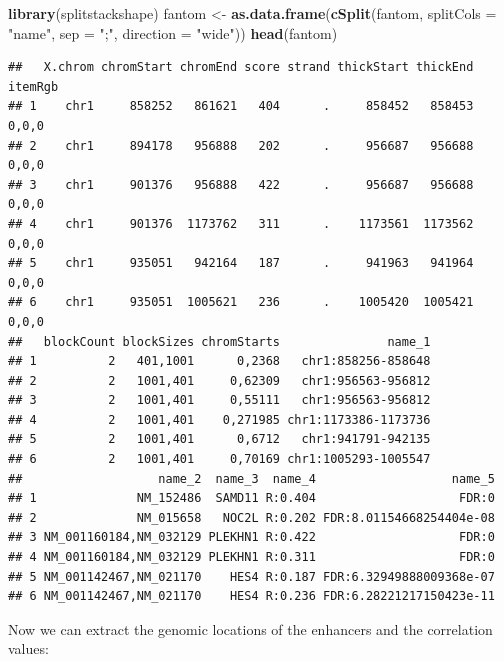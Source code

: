 \documentclass[9pt,a4paper,]{extarticle}
\newenvironment{Shaded}{\begin{snugshade}}{\end{snugshade}}
\newcommand{\KeywordTok}[1]{\textcolor[rgb]{0.13,0.29,0.53}{\textbf{#1}}}
\newcommand{\DataTypeTok}[1]{\textcolor[rgb]{0.13,0.29,0.53}{#1}}
\newcommand{\StringTok}[1]{\textcolor[rgb]{0.31,0.60,0.02}{#1}}
\newcommand{\NormalTok}[1]{#1}
\begin{document}
\begin{Shaded}
\begin{Highlighting}[]
\KeywordTok{library}\NormalTok{(splitstackshape)}
\NormalTok{fantom <-}\StringTok{ }\KeywordTok{as.data.frame}\NormalTok{(}\KeywordTok{cSplit}\NormalTok{(fantom, }\DataTypeTok{splitCols =} \StringTok{"name"}\NormalTok{, }\DataTypeTok{sep =} \StringTok{";"}\NormalTok{, }\DataTypeTok{direction =} \StringTok{"wide"}\NormalTok{))}
\KeywordTok{head}\NormalTok{(fantom)}
\end{Highlighting}
\end{Shaded}

\begin{verbatim}
##   X.chrom chromStart chromEnd score strand thickStart thickEnd itemRgb
## 1    chr1     858252   861621   404      .     858452   858453   0,0,0
## 2    chr1     894178   956888   202      .     956687   956688   0,0,0
## 3    chr1     901376   956888   422      .     956687   956688   0,0,0
## 4    chr1     901376  1173762   311      .    1173561  1173562   0,0,0
## 5    chr1     935051   942164   187      .     941963   941964   0,0,0
## 6    chr1     935051  1005621   236      .    1005420  1005421   0,0,0
##   blockCount blockSizes chromStarts               name_1
## 1          2   401,1001      0,2368   chr1:858256-858648
## 2          2   1001,401     0,62309   chr1:956563-956812
## 3          2   1001,401     0,55111   chr1:956563-956812
## 4          2   1001,401    0,271985 chr1:1173386-1173736
## 5          2   1001,401      0,6712   chr1:941791-942135
## 6          2   1001,401     0,70169 chr1:1005293-1005547
##                   name_2  name_3  name_4                   name_5
## 1              NM_152486  SAMD11 R:0.404                    FDR:0
## 2              NM_015658   NOC2L R:0.202 FDR:8.01154668254404e-08
## 3 NM_001160184,NM_032129 PLEKHN1 R:0.422                    FDR:0
## 4 NM_001160184,NM_032129 PLEKHN1 R:0.311                    FDR:0
## 5 NM_001142467,NM_021170    HES4 R:0.187 FDR:6.32949888009368e-07
## 6 NM_001142467,NM_021170    HES4 R:0.236 FDR:6.28221217150423e-11
\end{verbatim}

Now we can extract the genomic locations of the enhancers and the correlation values:
\end{document}

